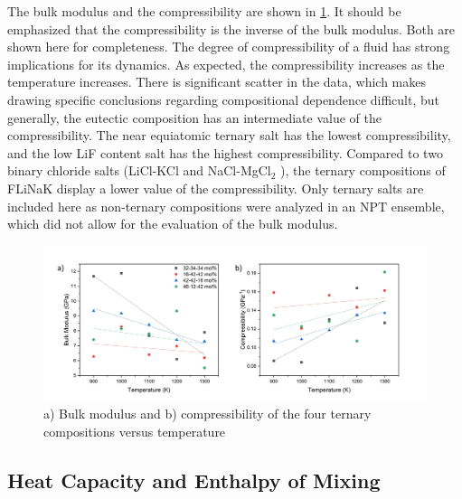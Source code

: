 \documentclass[preprint,12pt]{elsarticle}
\begin{document}
The bulk modulus and the compressibility are shown in \cref{fig:bulkCompress}. It should be emphasized that the compressibility is the inverse of the bulk modulus. Both are shown here for completeness. The degree of compressibility of a fluid has strong implications for its dynamics. As expected, the compressibility increases as the temperature increases. There is significant scatter in the data, which makes drawing specific conclusions regarding compositional dependence difficult, but generally, the eutectic composition has an intermediate value of the compressibility. The near equiatomic ternary salt has the lowest compressibility, and the low LiF content salt has the highest compressibility. Compared to two binary chloride salts (LiCl-KCl \cite{Duemmler2022} and NaCl-MgCl$_2$ \cite{Duemmler2022b}), the ternary compositions of FLiNaK display a lower value of the compressibility. Only ternary salts are included here as non-ternary compositions were analyzed in an NPT ensemble, which did not allow for the evaluation of the bulk modulus. 

\begin{figure}[!ht]
    \centering
    \includegraphics[width=\textwidth]{BulkCompress_2.jpg}
    \caption{a) Bulk modulus and b) compressibility of the four ternary compositions versus temperature}
    \label{fig:bulkCompress}
\end{figure}
\FloatBarrier

\subsection{Heat Capacity and Enthalpy of Mixing}
\end{document}
